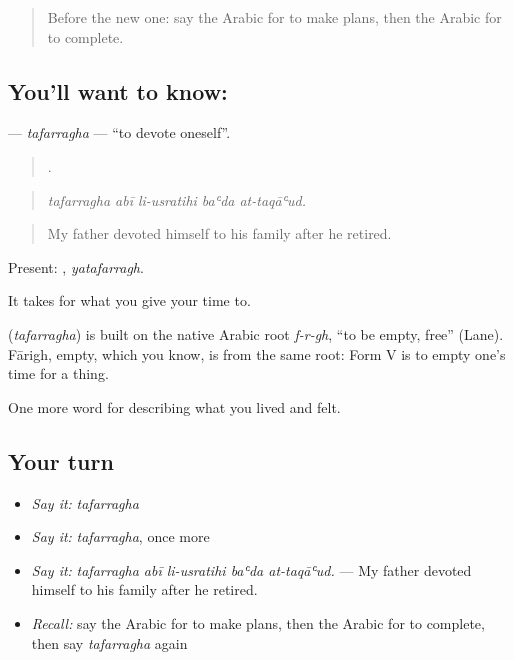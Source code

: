 \label{lesson:AR-C523-tafarragha}



\begin{quote}
Before the new one: say the Arabic for to make plans, then the Arabic for to complete.
\end{quote}

\subsection*{You'll want to know: }
\textbf{} — \emph{tafarragha} — \textquotedblleft{}to devote oneself\textquotedblright{}.

\begin{quote}
    .
\end{quote}

\begin{quote}
\emph{tafarragha abī li-usratihi baʿda at-taqāʿud.}
\end{quote}

\begin{quote}
My father devoted himself to his family after he retired.
\end{quote}

Present: , \emph{yatafarragh}.

It takes  for what you give your time to.

\begin{cousinweb}
\textbf{} (\emph{tafarragha}) is built on the native Arabic root \emph{f-r-gh}, \textquotedblleft{}to be empty, free\textquotedblright{} (Lane). Fārigh, empty, which you know, is from the same root: Form V is to empty one's time for a thing.
\end{cousinweb}

\begin{grammarlens}[title={What you've built}]
One more word for describing what you lived and felt.
\end{grammarlens}

\subsection*{Your turn}
\begin{itemize}
\raggedright
  \item \emph{Say it:} \emph{tafarragha}
  \item \emph{Say it:} \emph{tafarragha}, once more
  \item \emph{Say it:} \emph{tafarragha abī li-usratihi baʿda at-taqāʿud.} — My father devoted himself to his family after he retired.
  \item \emph{Recall:} say the Arabic for to make plans, then the Arabic for to complete, then say \emph{tafarragha} again
\end{itemize}

